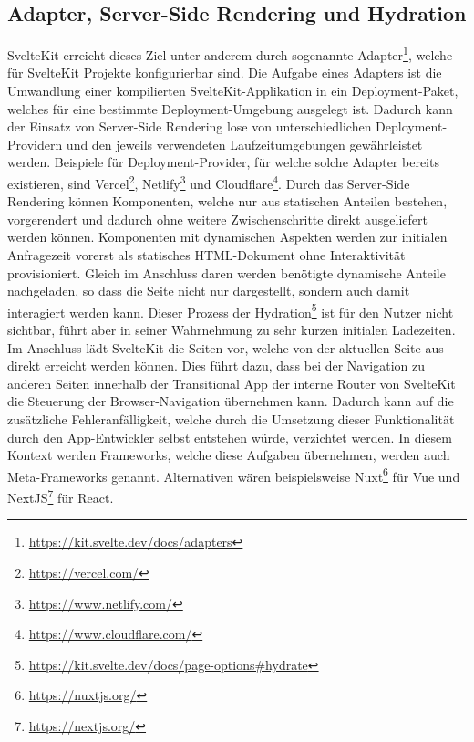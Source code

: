 \subsection{Adapter, Server-Side Rendering und Hydration}
SvelteKit erreicht dieses Ziel unter anderem durch sogenannte Adapter\footnote{\url{https://kit.svelte.dev/docs/adapters}}, welche für SvelteKit Projekte konfigurierbar sind. Die Aufgabe eines Adapters ist die Umwandlung einer kompilierten SvelteKit-Applikation in ein Deployment-Paket, welches für eine bestimmte Deployment-Umgebung ausgelegt ist. Dadurch kann der Einsatz von Server-Side Rendering lose von unterschiedlichen Deployment-Providern und den jeweils verwendeten Laufzeitumgebungen gewährleistet werden. Beispiele für Deployment-Provider, für welche solche Adapter bereits existieren, sind Vercel\footnote{\url{https://vercel.com/}}, Netlify\footnote{\url{https://www.netlify.com/}} und Cloudflare\footnote{\url{https://www.cloudflare.com/}}. Durch das Server-Side Rendering können Komponenten, welche nur aus statischen Anteilen bestehen, vorgerendert und dadurch ohne weitere Zwischenschritte direkt ausgeliefert werden können. Komponenten mit dynamischen Aspekten werden zur initialen Anfragezeit vorerst als statisches HTML-Dokument ohne Interaktivität provisioniert. Gleich im Anschluss daren werden benötigte dynamische Anteile nachgeladen, so dass die Seite nicht nur dargestellt, sondern auch damit interagiert werden kann. Dieser Prozess der Hydration\footnote{\url{https://kit.svelte.dev/docs/page-options\#hydrate}} ist für den Nutzer nicht sichtbar, führt aber in seiner Wahrnehmung zu sehr kurzen initialen Ladezeiten. Im Anschluss lädt SvelteKit die Seiten vor, welche von der aktuellen Seite aus direkt erreicht werden können. Dies führt dazu, dass bei der Navigation zu anderen Seiten innerhalb der Transitional App der interne Router von SvelteKit die Steuerung der Browser-Navigation übernehmen kann. Dadurch kann auf die zusätzliche Fehleranfälligkeit, welche durch die Umsetzung dieser Funktionalität durch den App-Entwickler selbst entstehen würde, verzichtet werden. In diesem Kontext werden Frameworks, welche diese Aufgaben übernehmen, werden auch Meta-Frameworks genannt. Alternativen wären beispielsweise Nuxt\footnote{\url{https://nuxtjs.org/}} für Vue und NextJS\footnote{\url{https://nextjs.org/}} für React.
